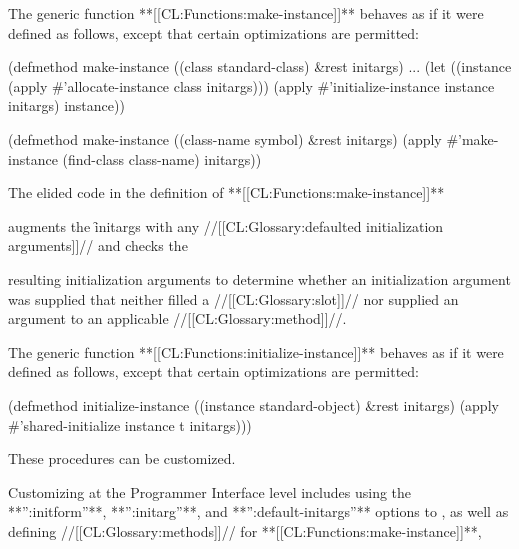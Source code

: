\endsubsection%

                      
The generic function **[[CL:Functions:make-instance]]** behaves as if it were defined as
follows, except that certain optimizations are permitted:

\code
 (defmethod make-instance ((class standard-class) &rest initargs)
   ...
   (let ((instance (apply #'allocate-instance class initargs)))
     (apply #'initialize-instance instance initargs)
     instance))

 (defmethod make-instance ((class-name symbol) &rest initargs)
   (apply #'make-instance (find-class class-name) initargs))
\endcode























                                      
The elided code in the definition of **[[CL:Functions:make-instance]]** 

augments the \f{initargs} with any //[[CL:Glossary:defaulted initialization arguments]]// and
checks the


resulting
initialization arguments to determine whether an initialization
argument was supplied that neither filled a //[[CL:Glossary:slot]]// nor supplied an argument
to an applicable //[[CL:Glossary:method]]//. 





                      
The generic function **[[CL:Functions:initialize-instance]]** behaves as if it were
defined as follows, except that certain optimizations are permitted:

\code
 (defmethod initialize-instance ((instance standard-object) &rest initargs)
   (apply #'shared-initialize instance t initargs)))
\endcode







These procedures can be customized.


                                                                  
Customizing at the Programmer Interface level includes using the 
**'':initform''**, **'':initarg''**, and **'':default-initargs''** options to
, as well as defining //[[CL:Glossary:methods]]//
for **[[CL:Functions:make-instance]]**, 

